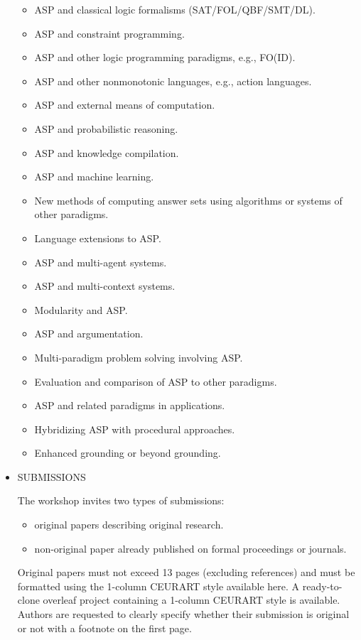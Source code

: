 \documentclass[prodmode,acmtecs]{acmsmall} %
\begin{document}
\begin{itemize}
\begin{itemize}\item  ASP and classical logic formalisms (SAT/FOL/QBF/SMT/DL).
\item  ASP and constraint programming.
\item  ASP and other logic programming paradigms, e.g., FO(ID).
\item  ASP and other nonmonotonic languages, e.g., action languages.
\item  ASP and external means of computation.
\item  ASP and probabilistic reasoning.
\item  ASP and knowledge compilation.
\item  ASP and machine learning.
\item  New methods of computing answer sets using algorithms or systems of other paradigms.
\item  Language extensions to ASP.
\item  ASP and multi-agent systems.
\item  ASP and multi-context systems.
\item  Modularity and ASP.
\item  ASP and argumentation.
\item  Multi-paradigm problem solving involving ASP.
\item  Evaluation and comparison of ASP to other paradigms.
\item  ASP and related paradigms in applications.
\item  Hybridizing ASP with procedural approaches.
\item  Enhanced grounding or beyond grounding.
\end{itemize} 
\item  SUBMISSIONS 
 
 The workshop invites two types of submissions: 
 
\begin{itemize}\item  original papers describing original research.
\item  non-original paper already published on formal proceedings or journals.
\end{itemize} 
 Original papers must not exceed 13 pages (excluding references) and must be formatted using the 1-column CEURART style available here. A ready-to-clone overleaf project containing a 1-column CEURART style is available. Authors are requested to clearly specify whether their submission is original or not with a footnote on the first page. 
 

\end{itemize}
\end{document}

